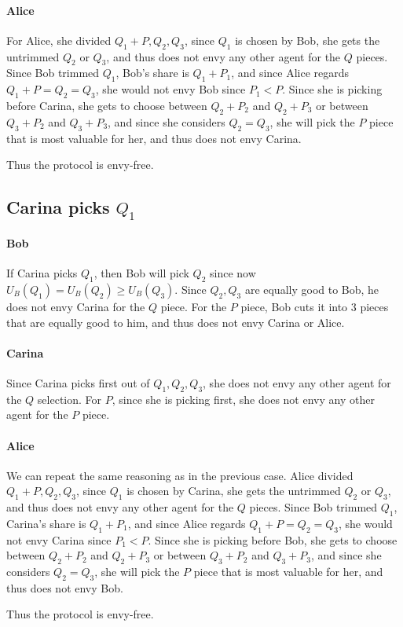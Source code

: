 \documentclass[12pt]{article}
\begin{document}
\paragraph*{Alice}
For Alice, she divided $Q_1+P, Q_2, Q_3$, since $Q_1$ is chosen by Bob, she gets the untrimmed $Q_2$ or $Q_3$, and thus 
does not envy any other agent for the $Q$ pieces. Since Bob trimmed $Q_1$, Bob's share is $Q_1 + P_1$, and since Alice 
regards $Q_1+P = Q_2 = Q_3$, she would not envy Bob since $P_1 < P$. Since she is picking before Carina, she gets to choose between 
$Q_2+P_2$ and $Q_2+P_3$ or between $Q_3+P_2$ and $Q_3+P_3$, and since she considers $Q_2 = Q_3$, she will pick the $P$ piece 
that is most valuable for her, and thus does not envy Carina.

Thus the protocol is envy-free.

\subsection*{Carina picks $Q_1$}
\paragraph*{Bob}
If Carina picks $Q_1$, then Bob will pick $Q_2$ since now $U_B(Q_1) = U_B(Q_2) \geq U_B(Q_3)$. 
Since $Q_2, Q_3$ are equally good to Bob, he does not envy Carina for the $Q$ piece. For the $P$ piece, 
Bob cuts it into 3 pieces that are equally good to him, and thus does not envy Carina or Alice.

\paragraph*{Carina}
Since Carina picks first out of $Q_1, Q_2, Q_3$, she does not envy any other agent for the $Q$ selection. For $P$, 
since she is picking first, she does not envy any other agent for the $P$ piece. 

\paragraph*{Alice}
We can repeat the same reasoning as in the previous case. Alice divided $Q_1+P, Q_2, Q_3$, since $Q_1$ is chosen by Carina, she gets the untrimmed $Q_2$ or $Q_3$, and thus 
does not envy any other agent for the $Q$ pieces. Since Bob trimmed $Q_1$, Carina's share is $Q_1 + P_1$, and since Alice 
regards $Q_1+P = Q_2 = Q_3$, she would not envy Carina since $P_1 < P$. Since she is picking before Bob, she gets to choose between 
$Q_2+P_2$ and $Q_2+P_3$ or between $Q_3+P_2$ and $Q_3+P_3$, and since she considers $Q_2 = Q_3$, she will pick the $P$ piece 
that is most valuable for her, and thus does not envy Bob.

Thus the protocol is envy-free.
\end{document}
